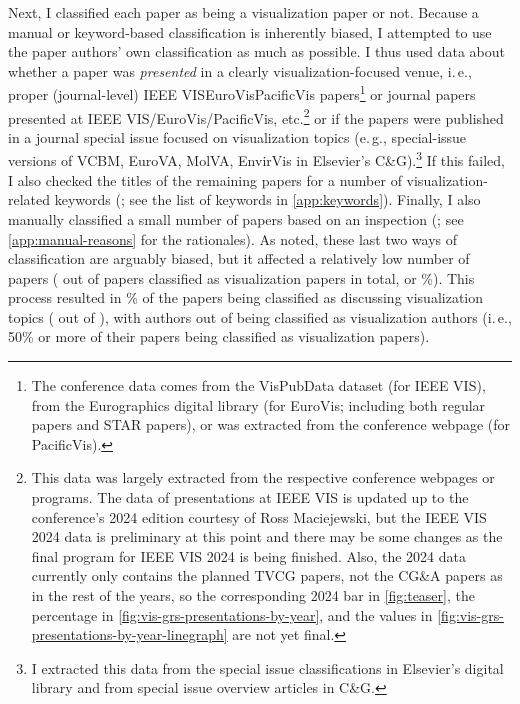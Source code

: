 \documentclass[conference]{vgtc}                     %
\newcommand{\eg}{e.\,g.}
\newcommand{\ie}{i.\,e.}
\begin{document}
Next, I classified each paper as being a visualization paper or not. Because a manual or keyword-based classification is inherently biased, I attempted to use the paper authors' own classification as much as possible. I thus used data about whether a paper was \emph{presented} in a clearly visualization-focused venue, \ie, proper (journal-level) IEEE VIS\discretionary{/}{}{/}Euro\-Vis\discretionary{/}{}{/}Paci\-fic\-Vis papers\footnote{The conference data comes from the VisPubData dataset \cite{Isenberg:2017:VMC} (for IEEE VIS), from the Eurographics digital library (for EuroVis; including both regular papers and STAR papers), or was extracted from the conference webpage (for PacificVis).} or journal papers presented at IEEE VIS/EuroVis/PacificVis, etc.\footnote{\label{foot:vis_presentations}This data was largely extracted from the respective conference webpages or programs. The data of presentations at IEEE VIS is updated up to the conference's 2024 edition courtesy of Ross Maciejewski, but the IEEE VIS 2024 data is preliminary at this point and there may be some changes as the final program for IEEE VIS 2024 is being finished. Also, the 2024 data currently only contains the planned TVCG papers, not the CG\&A papers as in the rest of the years, so the corresponding 2024 bar in \autoref{fig:teaser}, the percentage in \autoref{fig:vis-grs-presentations-by-year}, and the values in \autoref{fig:vis-grs-presentations-by-year-linegraph} are not yet final.} or if the papers were published in a journal special issue focused on visualization topics (\eg, special-issue versions of VCBM, EuroVA, MolVA, EnvirVis in Elsevier's C\&G).\footnote{I extracted this data from the special issue classifications in Elsevier's digital library and from special issue overview articles in C\&G.} If this failed, I also checked the titles of the remaining papers for a number of visualization-related keywords (\GrsiVisByKeywordPapersCount{}\texttimes; see the list of keywords in \autoref{app:keywords}). Finally, I also manually classified a small number of papers based on an inspection (\GrsiVisManuallyMarkedPapersCount{}\texttimes; see \autoref{app:manual-reasons} for the rationales). As noted, these last two ways of classification are arguably biased, but it affected a relatively low number of papers (\GrsiVisKeywordPlusManualPapersCount{} out of \GrsiTotalVisPapers{} papers classified as visualization papers in total, or \GrsiVisKeywordPlusManualPapersPercentage{}\%). This process resulted in \GrsiPercentageVisPapers{}\% of the papers being classified as discussing visualization topics (\GrsiTotalVisPapers{} out of \GrsiTotalPapers{}), with \GrsiTotalVisAuthors{} authors out of \GrsiTotalAuthors{} being classified as visualization authors (\ie, 50\% or more of their papers being classified as visualization papers).
\end{document}
